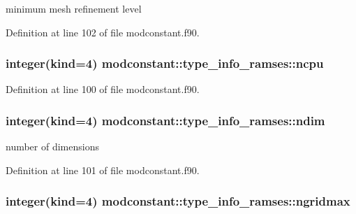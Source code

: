 minimum mesh refinement level 



Definition at line 102 of file modconstant.\-f90.

\hypertarget{structmodconstant_1_1type__info__ramses_a9ad0413ab7cfb052b2fd0c118b3813d3}{
\subsubsection[{ncpu}]{\setlength{\rightskip}{0pt plus 5cm}integer(kind=4) modconstant\-::type\-\_\-info\-\_\-ramses\-::ncpu}}\label{structmodconstant_1_1type__info__ramses_a9ad0413ab7cfb052b2fd0c118b3813d3}


Definition at line 100 of file modconstant.\-f90.

\hypertarget{structmodconstant_1_1type__info__ramses_a66b83ff734472dc468970e94097b4a86}{
\subsubsection[{ndim}]{\setlength{\rightskip}{0pt plus 5cm}integer(kind=4) modconstant\-::type\-\_\-info\-\_\-ramses\-::ndim}}\label{structmodconstant_1_1type__info__ramses_a66b83ff734472dc468970e94097b4a86}


number of dimensions 



Definition at line 101 of file modconstant.\-f90.

\hypertarget{structmodconstant_1_1type__info__ramses_a9fe8aabf1664b5cc578a7dbdb0b33fe4}{
\subsubsection[{ngridmax}]{\setlength{\rightskip}{0pt plus 5cm}integer(kind=4) modconstant\-::type\-\_\-info\-\_\-ramses\-::ngridmax}}\label{structmodconstant_1_1type__info__ramses_a9fe8aabf1664b5cc578a7dbdb0b33fe4}


